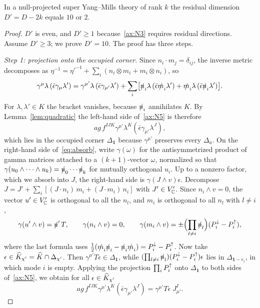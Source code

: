 \begin{theorem}
\label{thm:reduction}
In a null-projected super Yang--Mills theory of rank $k$ the residual dimension $D'=D-2k$ equals $10$ or $2$.
\end{theorem}

\begin{proof}
$D'$ is even, and $D'\ge1$ because~\ref{ax:N3} requires residual directions. Assume $D'\ge3$; we prove $D'=10$. The proof has three steps.

\emph{Step 1: projection onto the occupied corner.} Since $n_i\cdot m_j=\delta_{ij}$, the inverse metric decomposes as $\eta^{-1}=\eta'^{-1}+\sum_i(n_i\otimes m_i+m_i\otimes n_i)$, so
\begin{equation}
\label{eq:split}
\gamma^\mu\lambda\,(\bar\epsilon\gamma_\mu\lambda')=\gamma^{\mu'}\lambda\,(\bar\epsilon\gamma_{\mu'}\lambda')+\sum_i\bigl[\slashed{n}_i\lambda\,(\bar\epsilon\slashed{m}_i\lambda')+\slashed{m}_i\lambda\,(\bar\epsilon\slashed{n}_i\lambda')\bigr].
\end{equation}
For $\lambda,\lambda'\in K$ the bracket vanishes, because $\slashed{n}_i$ annihilates $K$. By Lemma~\ref{lem:quadratic} the left-hand side of~\ref{ax:N5} is therefore
\begin{equation}
\label{eq:lhs}
ag\,f^{IJK}\gamma^{\mu'}\lambda^K(\bar\epsilon\gamma_{\mu'}\lambda^J),
\end{equation}
which lies in the occupied corner $\Delta_{\mathbf 1}$ because $\gamma^{\mu'}$ preserves every $\Delta_a$. On the right-hand side of~\eqref{eq:absorb}, write $\gamma(\omega)$ for the antisymmetrized product of gamma matrices attached to a $(k+1)$-vector $\omega$, normalized so that $\gamma(u_0\wedge\cdots\wedge u_k)=\slashed{u}_0\cdots\slashed{u}_k$ for mutually orthogonal $u_i$. Up to a nonzero factor, which we absorb into $J$, the right-hand side is $\gamma(J\wedge v)\epsilon$. Decompose $J=J'+\sum_i[(J\cdot n_i)\,m_i+(J\cdot m_i)\,n_i]$ with $J'\in V'_{\mathbb{C}}$. Since $n_i\wedge v=0$, the vector $u'\in V'_{\mathbb{C}}$ is orthogonal to all the $n_l$, and $m_i$ is orthogonal to all $n_l$ with $l\ne i$,
\begin{equation}
\label{eq:antisym}
\gamma(u'\wedge v)=\slashed{u}'\,T,\qquad \gamma(n_i\wedge v)=0,\qquad \gamma(m_i\wedge v)=\pm\Bigl(\prod_{l\ne i}\slashed{n}_l\Bigr)(P^{\downarrow}_i-P^{\uparrow}_i),
\end{equation}
where the last formula uses $\frac12(\slashed{m}_i\slashed{n}_i-\slashed{n}_i\slashed{m}_i)=P^{\downarrow}_i-P^{\uparrow}_i$. Now take $\epsilon\in\widehat{K}_{\chi'}=\widehat{K}\cap\Delta_{\chi'}$. Then $\gamma^{\mu'}T\epsilon\in\Delta_{\mathbf 1}$, while $(\prod_{l\ne i}\slashed{n}_l)(P^{\downarrow}_i-P^{\uparrow}_i)\epsilon$ lies in $\Delta_{\mathbf 1-e_i}$, in which mode $i$ is empty. Applying the projection $\prod_iP^{\uparrow}_i$ onto $\Delta_{\mathbf 1}$ to both sides of~\ref{ax:N5}, we obtain for all $\epsilon\in\widehat{K}_{\chi'}$
\begin{equation}
\label{eq:proj1}
ag\,f^{IJK}\gamma^{\mu'}\lambda^K(\bar\epsilon\gamma_{\mu'}\lambda^J)=\gamma^{\mu'}T\epsilon\;J^I_{\mu'} .
\end{equation}


\end{proof}
